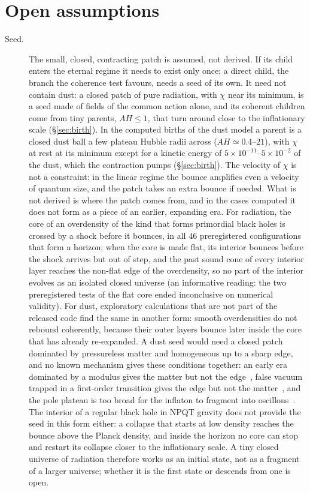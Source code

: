 \documentclass[11pt,a4paper]{article}
\begin{document}
\section{Open assumptions}
\label{sec:open}

\begin{description}
\item[Seed.] The small, closed, contracting patch is assumed, not derived. If its child enters the eternal regime it needs to exist only once; a direct child, the branch the coherence test favours, needs a seed of its own. It need not contain dust: a closed patch of pure radiation, with $\chi$ near its minimum, is a seed made of fields of the common action alone, and its coherent children come from tiny parents, $AH\le1$, that turn around close to the inflationary scale (\S\ref{sec:birth}). In the computed births of the dust model a parent is a closed dust ball a few plateau Hubble radii across ($AH\simeq0.4$--$21$), with $\chi$ at rest at its minimum except for a kinetic energy of $5\times10^{-11}$--$5\times10^{-2}$ of the dust, which the contraction pumps (\S\ref{sec:birth}). The velocity of $\chi$ is not a constraint: in the linear regime the bounce amplifies even a velocity of quantum size, and the patch takes an extra bounce if needed. What is not derived is where the patch comes from, and in the cases computed it does not form as a piece of an earlier, expanding era. For radiation, the core of an overdensity of the kind that forms primordial black holes is crossed by a shock before it bounces, in all $46$ preregistered configurations that form a horizon; when the core is made flat, its interior bounces before the shock arrives but out of step, and the past sound cone of every interior layer reaches the non-flat edge of the overdensity, so no part of the interior evolves as an isolated closed universe (an informative reading: the two preregistered tests of the flat core ended inconclusive on numerical validity). For dust, exploratory calculations that are not part of the released code find the same in another form: smooth overdensities do not rebound coherently, because their outer layers bounce later inside the core that has already re-expanded. A dust seed would need a closed patch dominated by pressureless matter and homogeneous up to a sharp edge, and no known mechanism gives these conditions together: an early era dominated by a modulus gives the matter but not the edge~\cite{KSW2015}, false vacuum trapped in a first-order transition gives the edge but not the matter~\cite{Liu2022PT}, and the pole plateau is too broad for the inflaton to fragment into oscillons~\cite{Amin2012}. The interior of a regular black hole in NPQT gravity does not provide the seed in this form either: a collapse that starts at low density reaches the bounce above the Planck density, and inside the horizon no core can stop and restart its collapse closer to the inflationary scale. A tiny closed universe of radiation therefore works as an initial state, not as a fragment of a larger universe; whether it is the first state or descends from one is open.

\end{description}
\end{document}
